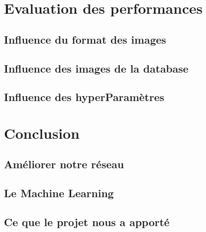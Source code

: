 \documentclass[a4paper,12pt]{article}
\begin{document}
\newpage
\section{Evaluation des performances}
  
  \subsection{Influence du format des images}
  
  \subsection{Influence des images de la database}
  
  \subsection{Influence des hyperParamètres}

\newpage
\section*{Conclusion}
  
  \subsection{Améliorer notre réseau}
  
  \subsection{Le Machine Learning}
  
  \subsection{Ce que le projet nous a apporté}
\end{document}
